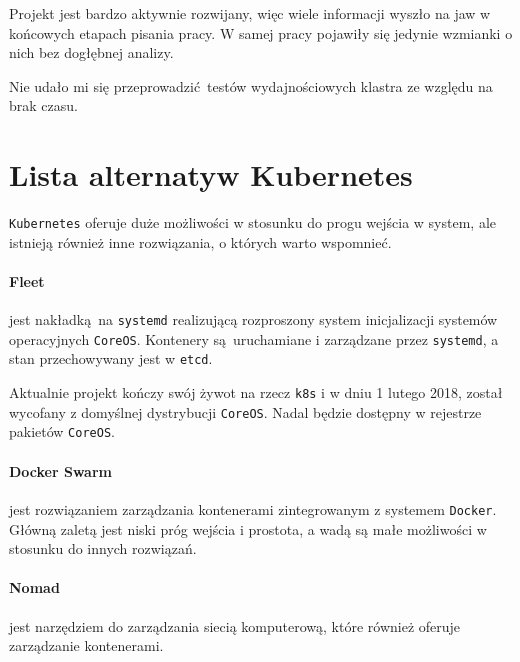 \documentclass[a4paper,12pt,twoside,openany]{report}
\newcommand{\passthrough}[1]{#1}
\begin{document}
Projekt jest bardzo aktywnie rozwijany, więc wiele informacji wyszło na
jaw w końcowych etapach pisania pracy. W samej pracy pojawiły się
jedynie wzmianki o nich bez dogłębnej analizy.

Nie udało mi się przeprowadzić~testów wydajnościowych klastra ze względu
na brak czasu.

\hypertarget{lista-alternatyw-kubernetes}{%
\section{Lista alternatyw
Kubernetes}\label{lista-alternatyw-kubernetes}}

\passthrough{\lstinline!Kubernetes!} oferuje duże możliwości w stosunku
do progu wejścia w system, ale istnieją również inne rozwiązania, o
których warto wspomnieć.

\hypertarget{fleet}{%
\paragraph{Fleet}\label{fleet}}

jest nakładką~na \passthrough{\lstinline!systemd!} realizującą
rozproszony system inicjalizacji systemów operacyjnych
\passthrough{\lstinline!CoreOS!}. Kontenery są~uruchamiane i zarządzane
przez \passthrough{\lstinline!systemd!}, a stan przechowywany jest w
\passthrough{\lstinline!etcd!}.

Aktualnie projekt kończy swój żywot na rzecz
\passthrough{\lstinline!k8s!} i w dniu 1 lutego 2018, został wycofany z
domyślnej dystrybucji \passthrough{\lstinline!CoreOS!}. Nadal będzie
dostępny w rejestrze pakietów \passthrough{\lstinline!CoreOS!}.

\hypertarget{docker-swarm}{%
\paragraph{Docker Swarm}\label{docker-swarm}}

jest rozwiązaniem zarządzania kontenerami zintegrowanym z systemem
\passthrough{\lstinline!Docker!}. Główną zaletą jest niski próg wejścia
i prostota, a wadą są małe możliwości w stosunku do innych rozwiązań.

\hypertarget{nomad}{%
\paragraph{Nomad}\label{nomad}}

jest narzędziem do zarządzania siecią komputerową, które również oferuje
zarządzanie kontenerami.
\end{document}
